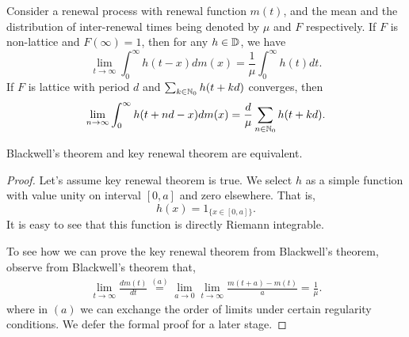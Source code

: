 \documentclass[a4paper,10pt,english]{article}
\begin{document}
\begin{thm} 
Consider a renewal process with renewal function $m(t)$, and the mean and the distribution of inter-renewal times being denoted by $\mu$ and $F$ respectively. 
If $F$ is non-lattice and $F(\infty) = 1$, then for any $h \in \mathbb{D}$, we have 
\begin{equation}
\label{eqn:Key Renewal Theorem}
\lim_{t \to \infty} \int_{0}^{\infty}h(t-x)dm(x)=\frac{1}{\mu}\int_{0}^{\infty}h(t)dt. 
\end{equation}
If $F$ is lattice with period $d$ and $\sum_{k \in \mathbb{N}_0}h(t+kd)$ converges, then 
\begin{align*}
\lim_{n \to \infty} \int_{0}^{\infty}h(t+nd-x)dm(x)=\frac{d}{\mu}\sum_{n \in \mathbb{N}_0}h(t+kd). 
\end{align*}
\end{thm}
\begin{prop}[Equivalence] Blackwell's theorem and key renewal theorem are equivalent.
\end{prop}
\begin{proof} Let's assume key renewal theorem is true. We select $h$ as a simple function with value unity on interval $[0, a]$ and zero elsewhere. That is,
\begin{equation*}
h(x) = 1_{\{ x \in [0,a]\}}.
\end{equation*}
It is easy to see that this function is directly Riemann integrable. %

To see how we can prove the key renewal theorem from Blackwell's theorem, observe from Blackwell's theorem that,
\begin{align*}
\lim_{t \to \infty}\frac{dm(t)}{dt} \stackrel{(a)}= \lim_{a \to 0}\lim_{t \to \infty} \frac{m(t
+a)-m(t)}{a}=\frac{1}{\mu}.
\end{align*}     
where in $(a)$ we can exchange the order of limits under certain regularity conditions. 
We defer the formal proof for a later stage.
\end{proof}
\end{document}
